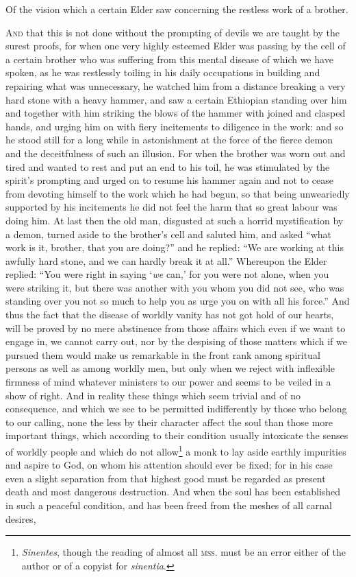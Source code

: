 
Of the vision which a certain Elder saw concerning the restless work of a brother.

\textsc{And} that this is not done without the prompting of devils we are taught by the surest proofs, for when one very highly esteemed Elder was passing by the cell of a certain brother who was suffering from this mental disease of which we have spoken, as he was restlessly toiling in his daily occupations in building and repairing what was unnecessary, he watched him from a distance breaking a very hard stone with a heavy hammer, and saw a certain Ethiopian standing over him and together with him striking the blows of the hammer with joined and clasped hands, and urging him on with fiery incitements to diligence in the work: and so he stood still for a long while in astonishment at the force of the fierce demon and the deceitfulness of such an illusion. For when the brother was worn out and tired and wanted to rest and put an end to his toil, he was stimulated by the spirit’s prompting and urged on to resume his hammer again and not to cease from devoting himself to the work which he had begun, so that being unweariedly supported by his incitements he did not feel the harm that so great labour was doing him. At last then the old man, disgusted at such a horrid mystification by a demon, turned aside to the brother’s cell and saluted him, and asked “what work is it, brother, that you are doing?” and he replied: “We are working at this awfully hard stone, and we can hardly break it at all.” Whereupon the Elder replied: “You were right in saying ‘\emph{we} can,’ for you were not alone, when you were striking it, but there was another with you whom you did not see, who was standing over you not so much to help you as urge you on with all his force.” And thus the fact that the disease of worldly vanity has not got hold of our hearts, will be proved by no mere abstinence from those affairs which even if we want to engage in, we cannot carry out, nor by the despising of those matters which if we pursued them would make us remarkable in the front rank among spiritual persons as well as among worldly men, but only when we reject with inflexible firmness of mind whatever ministers to our power and seems to be veiled in a show of right. And in reality these things which seem trivial and of no consequence, and which we see to be permitted indifferently by those who belong to our calling, none the less by their character affect the soul than those more important things, which according to their condition usually intoxicate the senses of worldly people and which do not allow\footnote{\emph{Sinentes}, though the reading of almost all \textsc{mss.} must be an error either of the author or of a copyist for \emph{sinentia}.} a monk to lay aside earthly impurities and aspire to God, on whom his attention should ever be fixed; for in his case even a slight separation from that highest good must be regarded as present death and most dangerous destruction. And when the soul has been established in such a peaceful condition, and has been freed from the meshes of all carnal desires, 